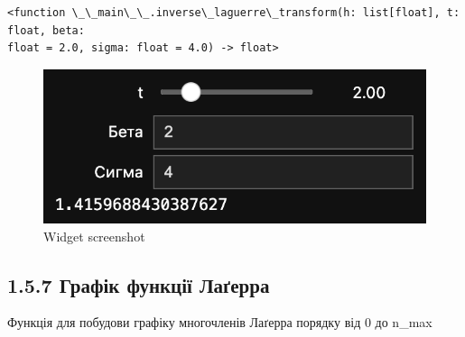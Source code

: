 \documentclass[11pt]{article}
\makeatletter
\newcommand{\boxspacing}{\kern\kvtcb@left@rule\kern\kvtcb@boxsep}
\newcommand{\prompt}[4]{
        {\ttfamily\llap{{\color{#2}[#3]:\hspace{3pt}#4}}\vspace{-\baselineskip}}
    }
\makeatother
\begin{document}
    
            \begin{tcolorbox}[breakable, size=fbox, boxrule=.5pt, pad at break*=1mm, opacityfill=0]
\prompt{Out}{outcolor}{12}{\boxspacing}
\begin{Verbatim}[commandchars=\\\{\}]
<function \_\_main\_\_.inverse\_laguerre\_transform(h: list[float], t: float, beta:
float = 2.0, sigma: float = 4.0) -> float>
\end{Verbatim}
\end{tcolorbox}
        
    \begin{figure}
\centering
\includegraphics{screenshots/5.png}
\caption{Widget screenshot}
\end{figure}
\newpage

    \subsection*{1.5.7 Графік функції
Лаґерра}\label{ux433ux440ux430ux444ux456ux43a-ux444ux443ux43dux43aux446ux456ux457-ux43bux430ux491ux435ux440ux440ux430}

Функція для побудови графіку многочленів Лаґерра порядку від 0 до n\_max
\end{document}
